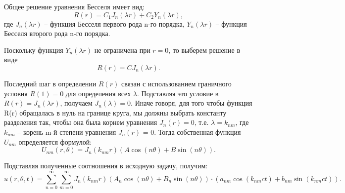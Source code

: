 Общее решение уравнения Бесселя имеет вид:
\[
    R(r) = C_1J_n(\lambda r) + C_2Y_n(\lambda r),
\]
где \( J_n(\lambda r) \) -- функция Бесселя первого рода n-го порядка, 
\( Y_n(\lambda r) \) -- функция Бесселя второго рода n-го порядка.

Поскольку функция \( Y_n(\lambda r) \) не ограничена при \( r = 0 \), то 
выберем решение в виде
\[
    R(r) = CJ_n(\lambda r).
\]

Последний шаг в определении \( R(r) \) связан с использованием граничного 
условия \( R(1) = 0 \) для определения всех \( \lambda \). Подставляя 
это условие в \( R(r) = J_n(\lambda r) \), получаем \( J_n(\lambda) = 0 \).
Иначе говоря, для того чтобы функция R(r) обращалась в нуль на границе 
круга, мы должны выбрать константу разделения так, чтобы она была корнем 
уравнения \( J_n(r) = 0 \), т.е. \( \lambda = k_{nm} \), где 
\( k_{nm} \) -- корень m-й степени уравнения \( J_n(r) \) = 0. Тогда 
собственная функция \( U_{nm} \) определяется формулой:
\[ 
    U_{nm}(r, \theta) = J_n(k_{nm}r)
    \left(A\cos(n\theta) + B\sin(n\theta)\right). 
\]

Подставляя полученные соотношения в исходную задачу, получим:
\[
    u(r, \theta, t) = \sum_{n=0}^{\infty}\sum_{m=0}^{\infty}
    J_n(k_{nm}r)\left(A_{n}\cos(n\theta) + B_{n}\sin(n\theta)\right)
    \cdot\left(a_{nm}\cos(k_{nm}ct) + b_{nm}\sin(k_{nm}ct)\right).
\]
